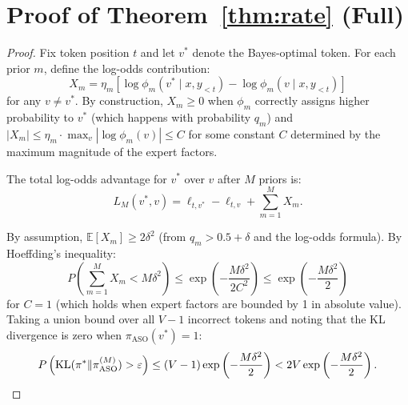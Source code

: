 \section{Proof of Theorem~\ref{thm:rate}
 (Full)}
\label{app:proof-rate}

\begin{proof}
Fix token position $t$ and let $v^*$ denote the Bayes-optimal token. For each
prior $m$, define the log-odds contribution:
\begin{equation}
    X_m = \eta_m \left[\log \phi_m(v^* \mid x, y_{<t}) - \log \phi_m(v \mid x, y_{<t})\right]
\end{equation}
for any $v \neq v^*$. By construction, $X_m \geq 0$ when $\phi_m$ correctly
assigns higher probability to $v^*$ (which happens with probability $q_m$) and
$|X_m| \leq \eta_m \cdot \max_v |\log \phi_m(v)| \leq C$ for some constant $C$
determined by the maximum magnitude of the expert factors.

The total log-odds advantage for $v^*$ over $v$ after $M$ priors is:
\begin{equation}
    L_M(v^*, v) = \ell_{t,v^*} - \ell_{t,v} + \sum_{m=1}^M X_m.
\end{equation}

By assumption, $\mathbb{E}[X_m] \geq 2\delta^2$ (from $q_m > 0.5 + \delta$
and the log-odds formula). By Hoeffding's inequality:
\begin{equation}
    P\left(\sum_{m=1}^M X_m < M\delta^2\right)
    \leq \exp\left(-\frac{M\delta^2}{2C^2}\right)
    \leq \exp\left(-\frac{M\delta^2}{2}\right)
\end{equation}
for $C = 1$ (which holds when expert factors are bounded by 1 in absolute
value). Taking a union bound over all $V - 1$ incorrect tokens and noting
that the KL divergence is zero when $\pi_{\text{ASO}}(v^*) = 1$:
\begin{equation}
    P\left(\operatorname{KL}(\pi^* \| \pi_{\text{ASO}}^{(M)}) > \varepsilon\right)
    \leq (V-1) \exp\left(-\frac{M\delta^2}{2}\right)
    < 2V \exp\left(-\frac{M\delta^2}{2}\right).
\end{equation}
\end{proof}

